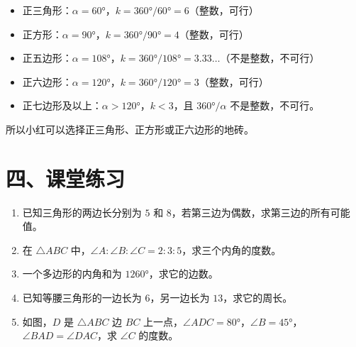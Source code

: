 \documentclass[12pt, a4paper]{ctexart}
\begin{document}
\begin{itemize}[nosep]
  \item 正三角形：$\alpha = 60°$，$k = 360° / 60° = 6$（整数，可行）
  \item 正方形：$\alpha = 90°$，$k = 360° / 90° = 4$（整数，可行）
  \item 正五边形：$\alpha = 108°$，$k = 360° / 108° = 3.33\ldots$（不是整数，不可行）
  \item 正六边形：$\alpha = 120°$，$k = 360° / 120° = 3$（整数，可行）
  \item 正七边形及以上：$\alpha > 120°$，$k < 3$，且 $360° / \alpha$ 不是整数，不可行。
\end{itemize}

所以小红可以选择正三角形、正方形或正六边形的地砖。

\section*{\textcolor{tipgreen}{四、课堂练习}}

\begin{enumerate}
  \item 已知三角形的两边长分别为 $5$ 和 $8$，若第三边为偶数，求第三边的所有可能值。

  \item 在 $\triangle ABC$ 中，$\angle A : \angle B : \angle C = 2 : 3 : 5$，求三个内角的度数。

  \item 一个多边形的内角和为 $1260°$，求它的边数。

  \item 已知等腰三角形的一边长为 $6$，另一边长为 $13$，求它的周长。

  \item 如图，$D$ 是 $\triangle ABC$ 边 $BC$ 上一点，$\angle ADC = 80°$，$\angle B = 45°$，$\angle BAD = \angle DAC$，求 $\angle C$ 的度数。

\begin{center}
\end{center}
\end{enumerate}
\end{document}
